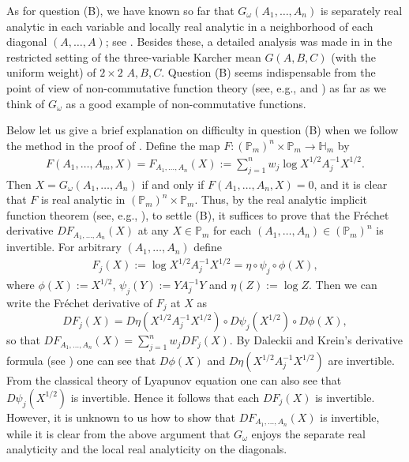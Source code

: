 \documentclass[11pt,reqno]{article}
\numberwithin{equation}{section}
\def\bH{\mathbb{H}}
\def\bP{\mathbb{P}}
\begin{document}
As for question (B), we have known so far that $G_\omega(A_1,\dots,A_n)$ is separately real analytic in
each variable and locally real analytic in a neighborhood of each diagonal $(A,\dots,A)$; see \cite{Law,LL2}.
Besides these, a detailed analysis was made in \cite{LL3} in the restricted setting of the three-variable Karcher
mean $G(A,B,C)$ (with the uniform weight) of $2\times2$ $A,B,C$. Question (B) seems indispensable from
the point of view of non-commutative function theory (see, e.g., \cite{KV} and \cite[Part Two]{AMY}) as far as
we think of $G_\omega$ as a good example of non-commutative functions.

Below let us give a brief explanation on difficulty in question (B) when we follow the method in the proof of
\cite[Theorem 6.3]{LL2}. Define the map $F:(\bP_m)^n\times\bP_m\to\bH_m$ by
\begin{align}\label{F-6.1}
F(A_1,\dots,A_m,X)=F_{A_1,\dots,A_n}(X):=\sum_{j=1}^nw_j\log X^{1/2}A_j^{-1}X^{1/2}.
\end{align}
Then $X=G_\omega(A_1,\dots,A_n)$ if and only if $F(A_1,\dots,A_n,X)=0$, and it is clear that $F$ is real
analytic in $(\bP_m)^n\times\bP_m$. Thus, by the real analytic implicit function theorem (see, e.g.,
\cite[Theorem 2.3.5]{KP}), to settle (B), it suffices to prove that the Fr\'echet derivative
$DF_{A_1,\dots,A_n}(X)$ at any $X\in\bP_m$ for each $(A_1,\dots,A_n)\in(\bP_m)^n$ is invertible. For
arbitrary $(A_1,\dots,A_n)$ define
\begin{align}\label{F-6.2}
F_j(X):=\log X^{1/2}A_j^{-1}X^{1/2}=\eta\circ\psi_j\circ\phi(X),
\end{align}
where $\phi(X):=X^{1/2}$, $\psi_j(Y):=YA_j^{-1}Y$ and $\eta(Z):=\log Z$. Then we can write the Fr\'echet
derivative of $F_j$ at $X$ as
\[
DF_j(X)=D\eta(X^{1/2}A_j^{-1}X^{1/2})\circ D\psi_j(X^{1/2})\circ D\phi(X),
\]
so that $DF_{A_1,\dots,A_n}(X)=\sum_{j=1}^nw_jDF_j(X)$. By Daleckii and Krein's derivative formula (see
\cite[Theorem V.3.3]{Bh}) one can see that $D\phi(X)$ and $D\eta(X^{1/2}A_j^{-1}X^{1/2})$ are invertible.
From the classical theory of Lyapunov equation one can also see that $D\psi_j(X^{1/2})$ is invertible. Hence
it follows that each $DF_j(X)$ is invertible. However, it is unknown to us how to show that
$DF_{A_1,\dots,A_n}(X)$ is invertible, while it is clear from the above argument that $G_\omega$ enjoys the
separate real analyticity and the local real analyticity on the diagonals.
\end{document}
